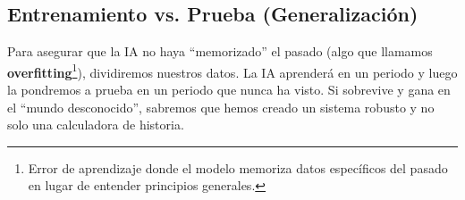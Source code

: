 \documentclass[12pt,a4paper]{article}
\begin{document}
\subsection{Entrenamiento vs. Prueba (Generalización)}

Para asegurar que la IA no haya ``memorizado'' el pasado (algo que llamamos \textbf{overfitting}\footnote{Error de aprendizaje donde el modelo memoriza datos específicos del pasado en lugar de entender principios generales.}), dividiremos nuestros datos. La IA aprenderá en un periodo y luego la pondremos a prueba en un periodo que nunca ha visto. Si sobrevive y gana en el ``mundo desconocido'', sabremos que hemos creado un sistema robusto y no solo una calculadora de historia.
\end{document}
